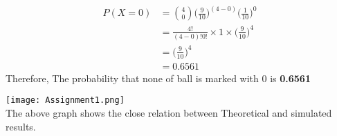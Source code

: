 \documentclass[a4paper]{article}
\begin{document}
\begin{multicols*}{2}
\begin{align}
P(X=0) &= \binom{4}{0} \bigg(\frac{9}{10}\bigg)^{(4-0)} \bigg(\frac{1}{10}\bigg)^{0} \\
&=\frac{4!}{(4-0)! 0!} \times 1 \times \bigg(\frac{9}{10}\bigg)^{4} \\
&=\bigg( \frac{9}{10}\bigg) ^{4} \\
&= 0.6561
\end{align}
Therefore, The probability that none of ball is marked with $0$ is \textbf{0.6561}

\texttt{[image: Assignment1.png]}\\
 The above graph shows the close relation between Theoretical and simulated results.

\end{multicols*}
\end{document}
